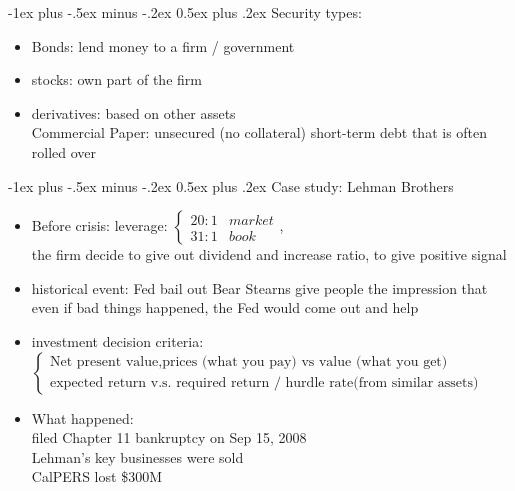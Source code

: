 \documentclass[10pt,landscape]{article}
\makeatletter
\renewcommand{\section}{\@startsection{section}{1}{0mm}%
                                {-1ex plus -.5ex minus -.2ex}%
                                {0.5ex plus .2ex}%
                                {\normalfont\large\bfseries}}
\makeatother
\begin{document}
\begin{multicols}{2}
\section{Security types:}
\begin{itemize}
	\item Bonds: lend money to a firm / government
	\item stocks: own part of the firm
	\item derivatives: based on other assets\\
		Commercial Paper: unsecured (no collateral) short-term debt that is often rolled over
\end{itemize}

\section{Case study: Lehman Brothers}
\begin{itemize}
	\item Before crisis: leverage: $\begin{cases}
		20:1 & market\\
		31:1 & book
	\end{cases}$, \\the firm decide to give out dividend and increase ratio, to give positive signal
	\item historical event: Fed bail out Bear Stearns give people the impression that even if bad things happened, the Fed would come out and help
	\item investment decision criteria:$\begin{cases}
		\text{Net present value} , \text{prices (what you pay) vs value (what you get)}\\
		\text{expected return v.s. required return / hurdle rate(from similar assets)} 
	\end{cases}$
	\item What happened: \\
		filed Chapter 11 bankruptcy on Sep 15, 2008\\
		Lehman's key businesses were sold\\
		CalPERS lost \$300M
\end{itemize}
	
\end{multicols}
\end{document}
